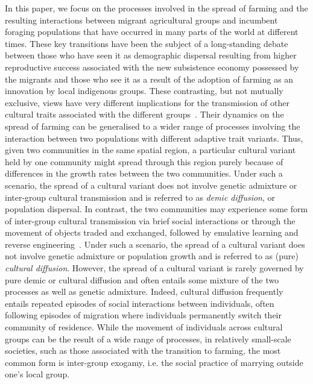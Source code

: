 \documentclass[9pt,twocolumn,twoside,lineno]{pnas-new}
\begin{document}
In this paper, we focus on the processes involved in the spread of farming and the resulting interactions between migrant agricultural groups and incumbent foraging populations that have occurred in many parts of the world at different times. 
These key transitions have been the subject of a long-standing debate between those who have seen it as demographic dispersal resulting from higher reproductive success associated with the new subsistence economy possessed by the migrants and those who see it as a result of the adoption of farming as an innovation by local indigenous groups. 
These contrasting, but not mutually exclusive, views have very different implications for the transmission of other cultural traits associated with the different groups~\citep{ammerman_neolithic_1984,fort_synthesis_2012}. 
Their dynamics on the spread of farming can be generalised to a wider range of processes involving the interaction between two populations with different adaptive trait variants.
Thus, given two communities in the same spatial region, a particular cultural variant held by one community might spread through this region purely because of differences in the growth rates between the two communities. 
Under such a scenario, the spread of a cultural variant does not involve genetic admixture or inter-group cultural transmission and is referred to as \emph{demic diffusion}, or population dispersal.
In contrast, the two communities may experience some form of inter-group cultural transmission via brief social interactions or through the movement of objects traded and exchanged, followed by emulative learning and reverse engineering~\citep{crema_how_2023}. 
Under such a scenario, the spread of a cultural variant does not involve genetic admixture or population growth and is referred to as (pure) \emph{cultural diffusion}.
However, the spread of a cultural variant is rarely governed by pure demic or cultural diffusion and often entails some mixture of the two processes as well as genetic admixture.
Indeed, cultural diffusion frequently entails repeated episodes of social interactions between individuals, often following episodes of migration where individuals permanently switch their community of residence.  
While the movement of individuals across cultural groups can be the result of a wide range of processes, in relatively small-scale societies, such as those associated with the transition to farming, the most common form is inter-group exogamy, i.e. the social practice of marrying outside one's local group.
\end{document}
